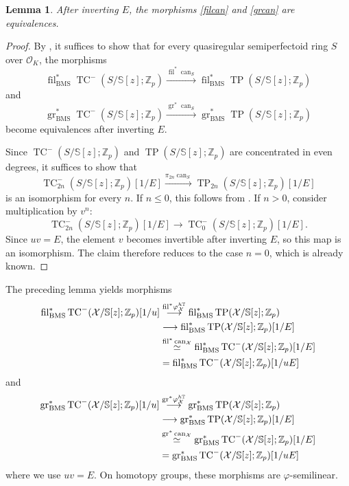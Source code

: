 \documentclass[11pt]{amsart}
\newtheorem{lemma}{Lemma}[section]
\numberwithin{equation}{section}
\newcommand{\Z}{\mathbb{Z}}
\newcommand{\sO}{\mathcal{O}}
\newcommand{\sX}{\mathcal{X}}
\newcommand{\gr}{{\operatorname{gr}}}
\newcommand{\fil}{{\operatorname{fil}}}
\newcommand{\BMS}{\mathrm{BMS}}
\newcommand{\can}{\operatorname{can}}
\numberwithin{equation}{section}
\newcommand{\TP}{\operatorname{TP}}
\newcommand{\TCn}{\operatorname{TC}^{-}}
\newcommand{\bS}{\mathbb{S}}
\begin{document}
\begin{lemma}
After inverting $E$, the morphisms \eqref{filcan} and \eqref{grcan} are equivalences.
\end{lemma}

\begin{proof}
By \cite[Proposition 4.31]{BMS19}, it suffices to show that for every quasiregular semiperfectoid ring $S$ over $\sO_K$, the morphisms
\begin{equation}\label{filcanaff}
  \fil_{\BMS}^*\TCn(S/\bS[z];\Z_p)
  \overset{\fil^*\can_S}{\longrightarrow}
  \fil_{\BMS}^*\TP(S/\bS[z];\Z_p)
\end{equation}
and
\begin{equation}\label{grcanaff}
  \gr_{\BMS}^*\TCn(S/\bS[z];\Z_p)
  \overset{\gr^*\can_S}{\longrightarrow}
  \gr_{\BMS}^*\TP(S/\bS[z];\Z_p)
\end{equation}
become equivalences after inverting $E$.

Since $\TCn(S/\bS[z];\Z_p)$ and $\TP(S/\bS[z];\Z_p)$ are concentrated in even degrees, it suffices to show that
\[
  \TCn_{2n}(S/\bS[z];\Z_p)[1/E]
  \overset{\pi_{2n}\can_S}{\longrightarrow}
  \TP_{2n}(S/\bS[z];\Z_p)[1/E]
\]
is an isomorphism for every $n$. If $n\leq 0$, this follows from \cite[Proposition 11.11]{BMS19}. If $n>0$, consider multiplication by $v^n$:
\[
  \TCn_{2n}(S/\bS[z];\Z_p)[1/E]\longrightarrow \TCn_0(S/\bS[z];\Z_p)[1/E].
\]
Since $uv=E$, the element $v$ becomes invertible after inverting $E$, so this map is an isomorphism. The claim therefore reduces to the case $n=0$, which is already known.
\end{proof}

The preceding lemma yields morphisms
\begin{align}
  \fil_{\BMS}^*\TCn(\sX/\bS[z];\Z_p)[1/u]
  &\overset{\fil^*\varphi_{\sX}^{h\mathbb{T}}}{\longrightarrow}
  \fil_{\BMS}^*\TP(\sX/\bS[z];\Z_p) \notag\\
  &\longrightarrow
  \fil_{\BMS}^*\TP(\sX/\bS[z];\Z_p)[1/E] \notag\\
  &\overset{\fil^*\can_{\sX}}{\simeq}
  \fil_{\BMS}^*\TCn(\sX/\bS[z];\Z_p)[1/E] \notag\\
  &=
  \fil_{\BMS}^*\TCn(\sX/\bS[z];\Z_p)[1/uE]
  \label{filfrobcan}
\end{align}
and
\begin{align}
  \gr_{\BMS}^*\TCn(\sX/\bS[z];\Z_p)[1/u]
  &\overset{\gr^*\varphi_{\sX}^{h\mathbb{T}}}{\longrightarrow}
  \gr_{\BMS}^*\TP(\sX/\bS[z];\Z_p) \notag\\
  &\longrightarrow
  \gr_{\BMS}^*\TP(\sX/\bS[z];\Z_p)[1/E] \notag\\
  &\overset{\gr^*\can_{\sX}}{\simeq}
  \gr_{\BMS}^*\TCn(\sX/\bS[z];\Z_p)[1/E] \notag\\
  &=
  \gr_{\BMS}^*\TCn(\sX/\bS[z];\Z_p)[1/uE]
  \label{grfrobcan}
\end{align}
where we use $uv=E$. On homotopy groups, these morphisms are $\varphi$-semilinear.
\end{document}
